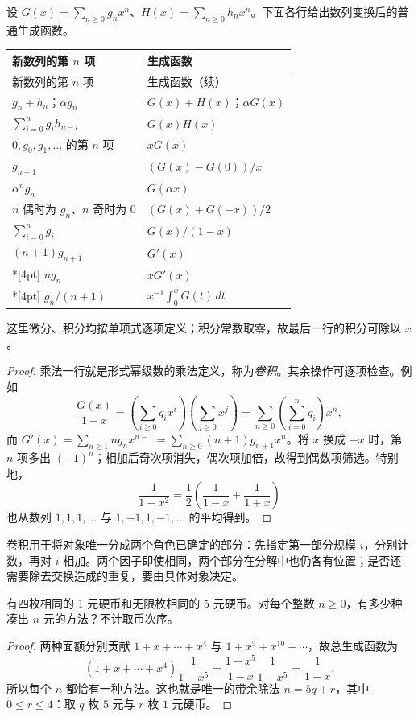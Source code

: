 \documentclass[lang=cn,a4paper,fontset=none,zihao=false,10pt,openany,twoside]{beautybook}
\numberwithin{algorithm}{chapter}
\begin{document}
\begin{proposition}[生成函数的基本操作]\label{prop:gf-operations}
设 $G(x)=\sum_{n\ge0}g_nx^n$、$H(x)=\sum_{n\ge0}h_nx^n$。下面各行给出数列变换后的普通生成函数。
\begingroup\small{}
\begin{longtable}{@{}p{}p{}@{}}
\toprule
新数列的第 $n$ 项 & 生成函数\\
\midrule\endfirsthead
\toprule 新数列的第 $n$ 项 & 生成函数（续）\\\midrule\endhead
\bottomrule\endfoot
$g_n+h_n$；$\alpha g_n$ & $G(x)+H(x)$；$\alpha G(x)$\\[4pt]
$\sum_{i=0}^n g_i h_{n-i}$ & $G(x)H(x)$\\[4pt]
$0,g_0,g_1,\ldots$ 的第 $n$ 项 & $xG(x)$\\[4pt]
$g_{n+1}$ & $(G(x)-G(0))/x$\\[4pt]
$\alpha^n g_n$ & $G(\alpha x)$\\[4pt]
$n$ 偶时为 $g_n$、$n$ 奇时为 $0$ & $(G(x)+G(-x))/2$\\[4pt]
$\sum_{i=0}^n g_i$ & $G(x)/(1-x)$\\[4pt]
$(n+1)g_{n+1}$ & $G'(x)$\\*[4pt]
$ng_n$ & $xG'(x)$\\*[4pt]
$g_n/(n+1)$ & $x^{-1}\int_0^xG(t)\,dt$\\
\end{longtable}
\endgroup
这里微分、积分均按单项式逐项定义；积分常数取零，故最后一行的积分可除以 $x$。
\end{proposition}
\begin{proof}
乘法一行就是形式幂级数的乘法定义，称为\emph{卷积}。其余操作可逐项检查。例如
\[
 \frac{G(x)}{1-x}
 =\left(\sum_{i\ge0}g_ix^i\right)\left(\sum_{j\ge0}x^j\right)
 =\sum_{n\ge0}\left(\sum_{i=0}^ng_i\right)x^n,
\]
而 $G'(x)=\sum_{n\ge1}ng_nx^{n-1}=\sum_{n\ge0}(n+1)g_{n+1}x^n$。将 $x$ 换成 $-x$ 时，第 $n$ 项多出 $(-1)^n$；相加后奇次项消失，偶次项加倍，故得到偶数项筛选。特别地，
\[
 \frac1{1-x^2}=\frac12\left(\frac1{1-x}+\frac1{1+x}\right)
\]
也从数列 $1,1,1,\ldots$ 与 $1,-1,1,-1,\ldots$ 的平均得到。
\end{proof}

卷积用于将对象唯一分成两个角色已确定的部分：先指定第一部分规模 $i$，分别计数，再对 $i$ 相加。两个因子即使相同，两个部分在分解中也仍各有位置；是否还需要除去交换造成的重复，要由具体对象决定。
\begin{example}[有限零钱与无限零钱]
有四枚相同的 $1$ 元硬币和无限枚相同的 $5$ 元硬币。对每个整数 $n\ge0$，有多少种凑出 $n$ 元的方法？不计取币次序。
\end{example}
\begin{proof}
两种面额分别贡献 $1+x+\cdots+x^4$ 与 $1+x^5+x^{10}+\cdots$，故总生成函数为
\[
 (1+x+\cdots+x^4)\frac1{1-x^5}
 =\frac{1-x^5}{1-x}\frac1{1-x^5}
 =\frac1{1-x}.
\]
所以每个 $n$ 都恰有一种方法。这也就是唯一的带余除法 $n=5q+r$，其中 $0\le r\le4$：取 $q$ 枚 $5$ 元与 $r$ 枚 $1$ 元硬币。
\end{proof}
\end{document}

